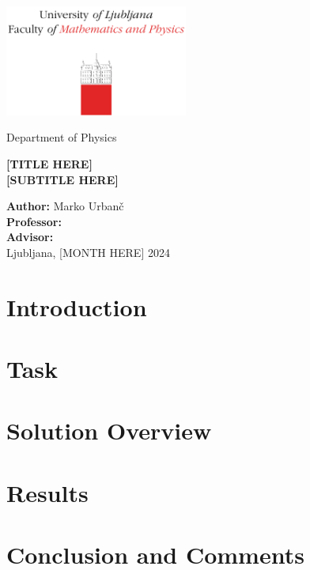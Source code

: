 \documentclass[10pt, titlepage, a4paper]{article}
\begin{document}
\begin{titlepage}
{\centering
\includegraphics[width=6cm]{logo_fmf.pdf}

\vspace{0.8cm}
{\small Department of Physics}

\vspace{5cm}
\vspace{0.5cm}
{\huge\textbf{[TITLE HERE]}} \\
\vspace{0.5cm}
{\large\textbf{[SUBTITLE HERE]}}

\vfill
\textbf{Author:} Marko Urbanč \\
\textbf{Professor:}  \\ 
\textbf{Advisor:}  \\

\vspace{1cm}
Ljubljana, [MONTH HERE] 2024 \\
}
\vspace{3cm}
\end{titlepage}

\hypersetup{pageanchor=true}
\setcounter{page}{2}
\tableofcontents
\vspace{1cm}


\section{Introduction}
\section{Task}
\section{Solution Overview}
\section{Results}
\section{Conclusion and Comments}

% 
% 

\end{document}
